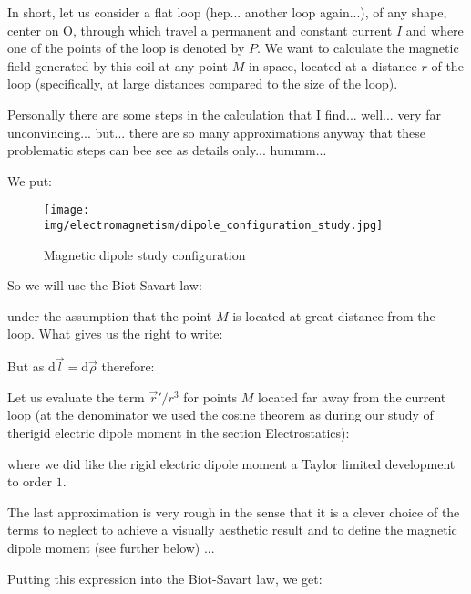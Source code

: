	In short, let us consider a flat loop (hep... another loop again...), of any shape, center on O, through which travel a permanent and constant current $I$ and where one of the points of the loop is denoted by $P$. We want to calculate the magnetic field generated by this coil at any point $M$ in space, located at a distance $r$ of the loop (specifically, at large distances compared to the size of the loop).
	\begin{tcolorbox}[title=Remark,colframe=black,arc=10pt]
	Personally there are some steps in the calculation that I find... well... very far unconvincing... but... there are so many approximations anyway that these problematic steps can bee see as details only... hummm...
	\end{tcolorbox}
	We put:
	
	\begin{figure}[H]
		\centering
		\texttt{[image: img/electromagnetism/dipole\_configuration\_study.jpg]}
		\caption{Magnetic dipole study configuration}
	\end{figure}
	So we will use the Biot-Savart law:
	
	under the assumption that the point $M$ is located at great distance from the loop. What gives us the right to write:
	
	But as $\mathrm{d}\vec{l}=\mathrm{d}\vec{\rho}$ therefore:
	
	Let us evaluate the term $\vec{r}'/r^3$ for points $M$ located far away from the current loop (at the denominator we used the cosine theorem as during our study of therigid electric dipole moment in the section Electrostatics):
	
	where we did like the rigid electric dipole moment a Taylor limited development to order $1$. 
	\begin{tcolorbox}[title=Remark,colframe=black,arc=10pt]
	The last approximation is very rough in the sense that it is a clever choice of the terms to neglect to achieve a visually aesthetic result and to define the magnetic dipole moment (see further below) ...
	\end{tcolorbox}
	Putting this expression into the Biot-Savart law, we get:
	
